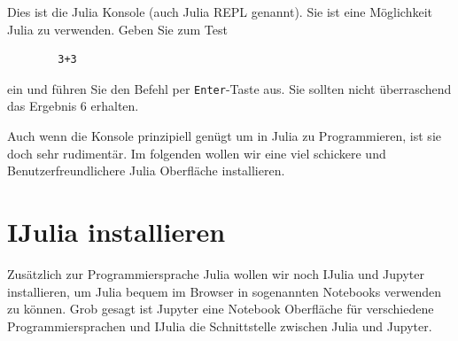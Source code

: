 \documentclass[11pt, a4paper]{scrartcl}
\begin{document}
	\begin{figure}[h!]
	\centering
	\end{figure}

	Dies ist die Julia Konsole (auch Julia REPL genannt). Sie ist eine Möglichkeit Julia zu verwenden. Geben Sie zum Test
	
	\begin{lstlisting}
		3+3
	\end{lstlisting}
	
	ein und führen Sie den Befehl per \texttt{Enter}-Taste aus. Sie sollten nicht überraschend das Ergebnis 6 erhalten.
	
	\vspace{1cm}
	
	Auch wenn die Konsole prinzipiell genügt um in Julia zu Programmieren, ist sie doch sehr rudimentär. Im folgenden wollen wir eine viel schickere und Benutzerfreundlichere Julia Oberfläche installieren.
	
	
	
	
	
	
	
	
	
	
	
	\newpage
	\section{IJulia installieren}
	
	Zusätzlich zur Programmiersprache Julia wollen wir noch IJulia und Jupyter installieren, um Julia bequem im Browser in sogenannten Notebooks verwenden zu können. Grob gesagt ist Jupyter eine Notebook Oberfläche für verschiedene Programmiersprachen und IJulia die Schnittstelle zwischen Julia und Jupyter. 
	
\end{document}

